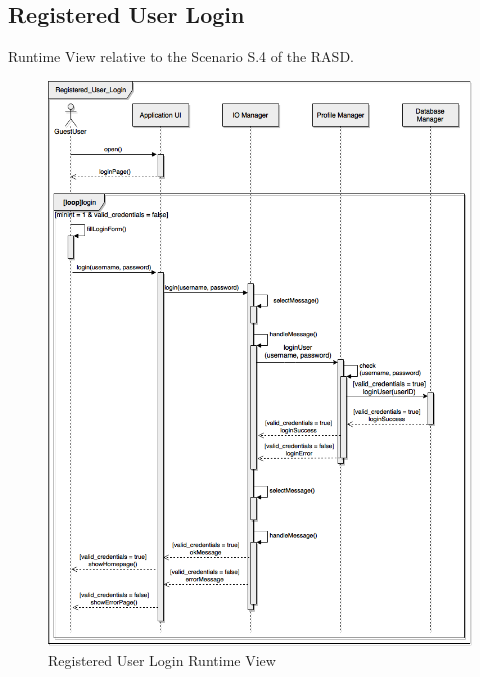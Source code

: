 \documentclass[../../../../../../dd.tex]{subfiles}
\begin{document}
	\subsection{Registered User Login}
		Runtime View relative to the Scenario S.4 of the RASD.
		\begin{figure}[H]
				\centering
				\includegraphics[width=\textwidth, scale=0.5]{../images/SequenceDiagrams/registeredUserLogin.png}
			\caption{Registered User Login Runtime View}\label{fig:RegisteredUserLogin}
		\end{figure}
		
\end{document}
